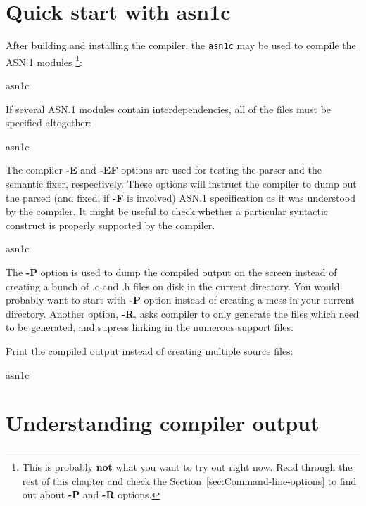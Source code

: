 \documentclass[english,oneside,12pt]{book}
\newcommand{\cmd}[1]{\texttt{#1}}
\begin{document}
\section{Quick start with asn1c}

After building and installing the compiler, the \cmd{asn1c}
may be used to compile the ASN.1 modules%
\footnote{This is probably \textbf{not} what you want to try out right now. Read through the rest of this chapter and check the Section~\ref{sec:Command-line-options}
to find out about \textbf{-P} and \textbf{-R} options.%
}:
\begin{bash}
asn1c %
\end{bash}
If several ASN.1 modules contain interdependencies, all of the files
must be specified altogether:
\begin{bash}
asn1c %
\end{bash}
The compiler \textbf{-E} and \textbf{-EF} options are used for testing
the parser and the semantic fixer, respectively. These options will
instruct the compiler to dump out the parsed (and fixed, if \textbf{-F}
is involved) ASN.1 specification as it was understood
by the compiler. It might be useful to check whether a particular
syntactic construct is properly supported by the compiler.
\begin{bash}
asn1c %
\end{bash}
The \textbf{-P} option is used to dump the compiled output on the
screen instead of creating a bunch of .c and .h files on disk in the
current directory. You would probably want to start with \textbf{-P}
option instead of creating a mess in your current directory. Another
option, \textbf{-R}, asks compiler to only generate the files which
need to be generated, and supress linking in the numerous support
files.

Print the compiled output instead of creating multiple source files:
\begin{bash}
asn1c %
\end{bash}

\clearpage{}
\section{Understanding compiler output}
\end{document}
